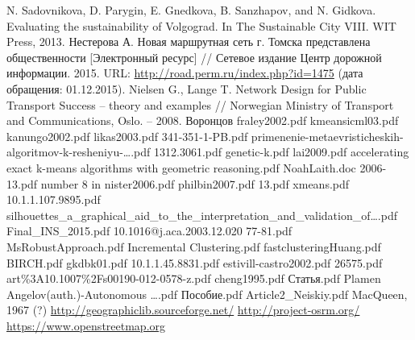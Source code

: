 \renewcommand{\bibname}{%
    \vspace{-1em}\begin{center}
        Список используемой литературы
    \end{center}\vspace{-2em}
}

\pagestyle{empty}

\begin{thebibliography}{99}
     N. Sadovnikova, D. Parygin, E. Gnedkova, B. Sanzhapov, and N. Gidkova. 
        Evaluating the sustainability of Volgograd. In The Sustainable City VIII. WIT Press, 2013.
     Нестерова А. Новая маршрутная сеть г. Томска представлена общественности 
        [Электронный ресурс] // Сетевое издание Центр дорожной информации. 2015. URL: 
        \url{http://road.perm.ru/index.php?id=1475} (дата обращения: 01.12.2015).
     Nielsen G., Lange T. Network Design for Public Transport Success -- theory and 
        examples // Norwegian Ministry of Transport and Communications, Oslo. -- 2008.
     Воронцов
     fraley2002.pdf
     kmeansicml03.pdf
     kanungo2002.pdf
     likas2003.pdf
     341-351-1-PB.pdf
     primenenie-metaevristicheskih-algoritmov-k-resheniyu-\ldots.pdf
     1312.3061.pdf
     genetic-k.pdf
     lai2009.pdf
     accelerating exact k-means algorithms with geometric reasoning.pdf
     NoahLaith.doc
     2006-13.pdf
     number 8 in \cite{lenka}
     nister2006.pdf
     philbin2007.pdf
     13.pdf
     xmeans.pdf
     10.1.1.107.9895.pdf
     silhouettes\_a\_graphical\_aid\_to\_the\_interpretation\_and\_validation\_of\ldots.pdf
     Final\_INS\_2015.pdf
     10.1016@j.aca.2003.12.020
     77-81.pdf
     MsRobustApproach.pdf
     Incremental Clustering.pdf
     fastclusteringHuang.pdf
     BIRCH.pdf
     gkdbk01.pdf
     10.1.1.45.8831.pdf
     estivill-castro2002.pdf
     26575.pdf
     art\%3A10.1007\%2Fs00190-012-0578-z.pdf
     cheng1995.pdf
     Статья.pdf
     Plamen Angelov(auth.)-Autonomous \ldots.pdf
     Пособие.pdf
     Article2\_Neiskiy.pdf
     MacQueen, 1967 (?)
     \url{http://geographiclib.sourceforge.net/}
     \url{http://project-osrm.org/}
     \url{https://www.openstreetmap.org}
        

\end{thebibliography}
